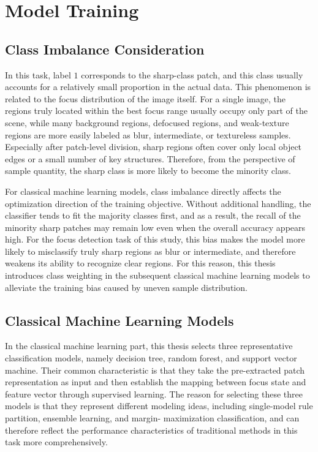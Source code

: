 \section{Model Training}
\subsection{Class Imbalance Consideration}
\par In this task, label $1$ corresponds to the sharp-class patch, and this
class usually accounts for a relatively small proportion in the actual data.
This phenomenon is related to the focus distribution of the image itself. For
a single image, the regions truly located within the best focus range usually
occupy only part of the scene, while many background regions, defocused
regions, and weak-texture regions are more easily labeled as blur,
intermediate, or textureless samples. Especially after patch-level division,
sharp regions often cover only local object edges or a small number of key
structures. Therefore, from the perspective of sample quantity, the sharp
class is more likely to become the minority class.

\par For classical machine learning models, class imbalance directly affects the
optimization direction of the training objective. Without additional handling,
the classifier tends to fit the majority classes first, and as a result, the
recall of the minority sharp patches may remain low even when the overall
accuracy appears high. For the focus detection task of this study, this bias
makes the model more likely to misclassify truly sharp regions as blur or
intermediate, and therefore weakens its ability to recognize clear regions.
For this reason, this thesis introduces class weighting in the subsequent
classical machine learning models to alleviate the training bias caused by
uneven sample distribution.

\subsection{Classical Machine Learning Models}
\par In the classical machine learning part, this thesis selects three
representative classification models, namely decision tree, random forest, and
support vector machine. Their common characteristic is that they take the
pre-extracted patch representation as input and then establish the mapping
between focus state and feature vector through supervised learning. The reason
for selecting these three models is that they represent different modeling
ideas, including single-model rule partition, ensemble learning, and margin-
maximization classification, and can therefore reflect the performance
characteristics of traditional methods in this task more comprehensively.

